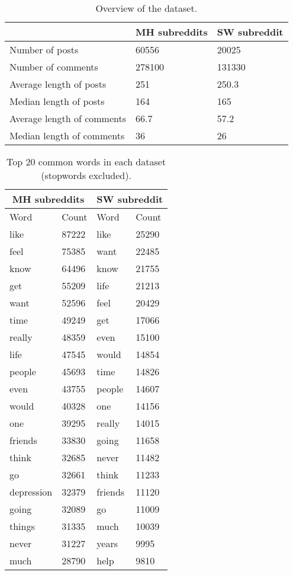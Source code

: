 \begin{table}
\noindent\begin{tabularx}{\textwidth}{>{\hsize=0.4\textwidth}XXX}
\toprule
 & MH subreddits & SW subreddit\\ 
\midrule
Number of posts & 60556  & 20025\\
Number of comments & 278100 &  131330\\ 
Average length of posts  & 251  & 250.3\\
Median length of posts & 164  &   165\\
Average length of comments     & 66.7   & 57.2\\
Median length of comments        &  36  &  26\\
\bottomrule
\end{tabularx}
\caption{Overview of the dataset.}
\label{tab:overview}
\end{table}
\begin{table}[h!]
\noindent\begin{tabularx}{\textwidth}{XXXX}
\toprule
\multicolumn{2}{c}{MH subreddits} & \multicolumn{2}{c}{SW subreddit} \\ 
\midrule
Word & Count & Word & Count\\
\midrule
like & 87222 &  like & 25290\\ 
feel  & 75385  & want & 22485\\
know & 64496 &  know &  21755\\
get    & 55209 & life & 21213\\
want  & 52596 & feel & 20429\\
time & 49249 & get & 17066\\
really & 48359 & even & 15100\\
life & 47545 & would & 14854\\
people & 45693 & time & 14826\\
 even & 43755 & people & 14607\\
would & 40328 & one & 14156\\
one & 39295 & really & 14015\\
friends & 33830 & going & 11658\\
think & 32685 & never & 11482\\
go & 32661 & think & 11233\\
depression & 32379 & friends & 11120\\
going & 32089 & go & 11009\\
things & 31335 & much & 10039\\
never & 31227 & years & 9995\\
much & 28790 & help & 9810\\
\bottomrule
\end{tabularx}
\caption{Top 20 common words in each dataset (stopwords excluded).}
\label{tab:common_words}
\end{table}
